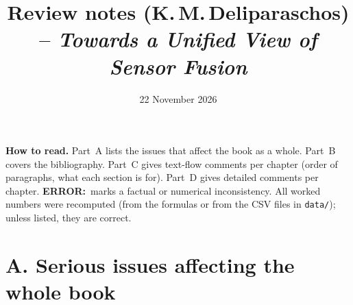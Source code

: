 \documentclass[10pt,a4paper]{article}
\title{Review notes (K.\,M.\,Deliparaschos) -- \emph{Towards a Unified View of Sensor Fusion}}
\author{}
\date{22 November 2026}
\newcommand{\err}{\textbf{ERROR:}~}
\begin{document}
\sloppy
\maketitle

\noindent\textbf{How to read.} Part~A lists the issues that affect the book as a whole. Part~B covers the bibliography. Part~C gives text-flow comments per chapter (order of paragraphs, what each section is for). Part~D gives detailed comments per chapter. \err marks a factual or numerical inconsistency.
All worked numbers were recomputed (from the formulas or from the CSV files in \texttt{data/}); unless listed, they are correct.

\section*{A. Serious issues affecting the whole book}
\end{document}

